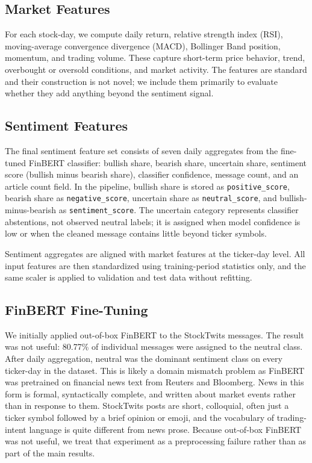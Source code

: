 \documentclass[10pt,twocolumn]{article}
\begin{document}
\subsection{Market Features}

For each stock-day, we compute daily return, relative strength index (RSI), moving-average convergence divergence (MACD), Bollinger Band position, momentum, and trading volume. These capture short-term price behavior, trend, overbought or oversold conditions, and market activity. The features are standard and their construction is not novel; we include them primarily to evaluate whether they add anything beyond the sentiment signal.

\subsection{Sentiment Features}

The final sentiment feature set consists of seven daily aggregates from the fine-tuned FinBERT classifier: bullish share, bearish share, uncertain share, sentiment score (bullish minus bearish share), classifier confidence, message count, and an article count field. In the pipeline, bullish share is stored as \texttt{positive\_score}, bearish share as \texttt{negative\_score}, uncertain share as \texttt{neutral\_score}, and bullish-minus-bearish as \texttt{sentiment\_score}. The uncertain category represents classifier abstentions, not observed neutral labels; it is assigned when model confidence is low or when the cleaned message contains little beyond ticker symbols.

Sentiment aggregates are aligned with market features at the ticker-day level. All input features are then standardized using training-period statistics only, and the same scaler is applied to validation and test data without refitting.

\subsection{FinBERT Fine-Tuning}

We initially applied out-of-box FinBERT \cite{araci2019finbert} to the StockTwits messages. The result was not useful: 80.77\% of individual messages were assigned to the neutral class. After daily aggregation, neutral was the dominant sentiment class on every ticker-day in the dataset. This is likely a domain mismatch problem as FinBERT was pretrained on financial news text from Reuters and Bloomberg. News in this form is formal, syntactically complete, and written about market events rather than in response to them. StockTwits posts are short, colloquial, often just a ticker symbol followed by a brief opinion or emoji, and the vocabulary of trading-intent language is quite different from news prose. Because out-of-box FinBERT was not useful, we treat that experiment as a preprocessing failure rather than as part of the main results.
\end{document}
